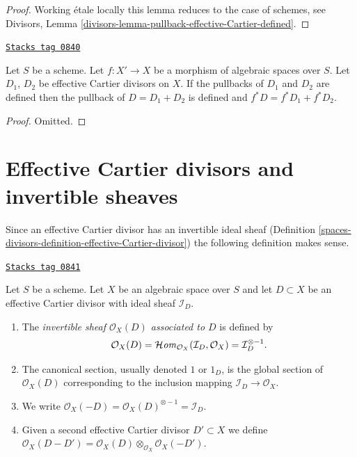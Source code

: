 \begin{proof}
Working \'etale locally this lemma reduces to the case of schemes, see
Divisors, Lemma \ref{divisors-lemma-pullback-effective-Cartier-defined}.
\end{proof}

\begin{lemma}
\label{spaces-divisors-lemma-pullback-effective-Cartier-divisors-additive}
\href{https://stacks.math.columbia.edu/tag/0840}{\texttt{Stacks tag 0840}}

Let $S$ be a scheme.
Let $f : X' \to X$ be a morphism of algebraic spaces over $S$.
Let $D_1$, $D_2$ be effective Cartier divisors on $X$.
If the pullbacks of $D_1$ and $D_2$ are defined then the
pullback of $D = D_1 + D_2$ is defined and
$f^*D = f^*D_1 + f^*D_2$.
\end{lemma}

\begin{proof}
Omitted.
\end{proof}

\section{Effective Cartier divisors and invertible sheaves}
\label{spaces-divisors-section-effective-Cartier-invertible}
Since an effective Cartier divisor has an invertible ideal sheaf
(Definition \ref{spaces-divisors-definition-effective-Cartier-divisor}) the
following definition makes sense.

\begin{definition}
\label{spaces-divisors-definition-invertible-sheaf-effective-Cartier-divisor}
\href{https://stacks.math.columbia.edu/tag/0841}{\texttt{Stacks tag 0841}}

Let $S$ be a scheme. Let $X$ be an algebraic space over $S$
and let $D \subset X$ be an effective Cartier divisor with ideal
sheaf $\mathcal{I}_D$.
\begin{enumerate}
\item The {\it invertible sheaf $\mathcal{O}_X(D)$ associated to $D$}
is defined by
$$
\mathcal{O}_X(D) =
\mathcal{H}\mathit{om}_{\mathcal{O}_X}(\mathcal{I}_D, \mathcal{O}_X) =
\mathcal{I}_D^{\otimes -1}.
$$
\item The canonical section, usually denoted $1$ or $1_D$, is the
global section of $\mathcal{O}_X(D)$ corresponding to
the inclusion mapping $\mathcal{I}_D \to \mathcal{O}_X$.
\item We write
$\mathcal{O}_X(-D) = \mathcal{O}_X(D)^{\otimes -1} = \mathcal{I}_D$.
\item Given a second effective Cartier divisor $D' \subset X$ we define
$\mathcal{O}_X(D - D') =
\mathcal{O}_X(D) \otimes_{\mathcal{O}_X} \mathcal{O}_X(-D')$.
\end{enumerate}
\end{definition}

